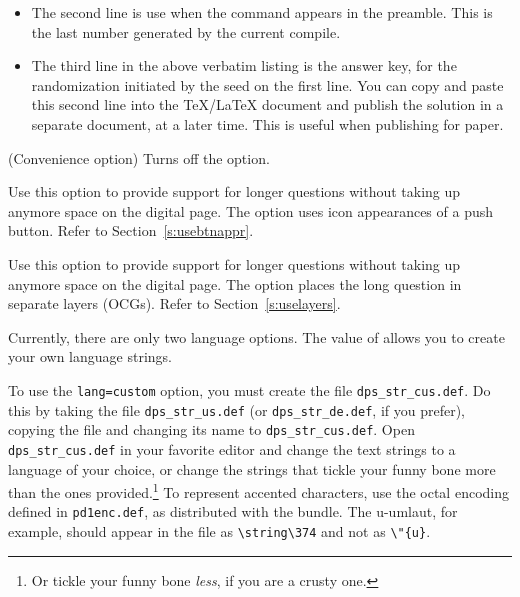 \documentclass{article}
\begin{document}
\begin{description}
\begin{itemize}
    \item The second line is use when the  command
        appears in the preamble. This is the last number generated by the
        current compile.

    \item The third line in the above verbatim listing is the answer key,
        for the randomization initiated by the seed on the first line.
        You can copy and paste this second line into the {\TeX/\LaTeX}
        document and publish the solution in a separate document, at a
        later time. This is useful when publishing for paper.
    \end{itemize}
\item[\normalfont{!\opt{savedata}}:] (Convenience option) Turns
    off the  option.


\item[\normalfont\opt{usebtnappr}] Use this option to provide support for
    longer questions without taking up anymore space on the digital page.
    The option uses icon appearances of a push button.
    Refer to Section~\ref{s:usebtnappr}.


\item[\normalfont\opt{uselayers}] Use this option to provide support for
    longer questions without taking up anymore space on the digital page.
    The option places the long question in separate layers (OCGs). Refer to
    Section~\ref{s:uselayers}.


\item[\normalfont{\opt{lang=english|german|custom}}:] Currently, there
    are only two language options. The value of  allows you to
    create your own language strings.

    To use the \texttt{lang=custom}
    option, you must create the file \texttt{dps\_str\_cus.def}. Do this by
    taking the file \texttt{dps\_str\_us.def} (or \texttt{dps\_str\_de.def},
    if you prefer), copying the file and changing its name to
    \texttt{dps\_str\_cus.def}. Open \texttt{dps\_str\_cus.def} in your
    favorite editor and change the text strings to a language of your
    choice, or change the strings that tickle your funny bone more than the
    ones provided.\footnote{Or tickle your funny bone \emph{less}, if you
    are a crusty one.} To represent accented characters, use the octal
    encoding defined in \texttt{pd1enc.def}, as distributed with
    the  bundle. The u-umlaut, for example, should appear
    in the file as \verb!\string\374! and not as \verb!\"{u}!.


\end{description}
\end{document}
